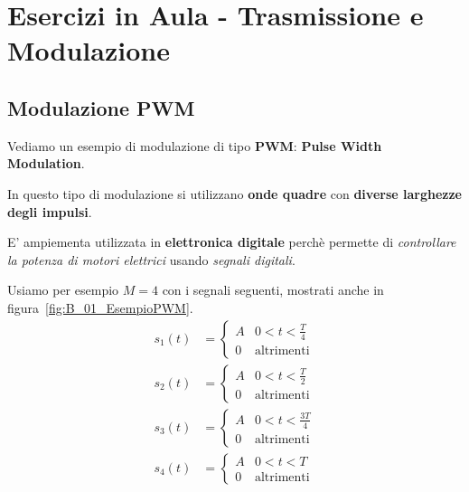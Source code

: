 
\chapter{Esercizi in Aula - Trasmissione e Modulazione}

\section{Modulazione PWM}

Vediamo un esempio di modulazione di
tipo \textbf{PWM}: \textbf{Pulse Width Modulation}.

\begin{remark}[PWM]
    In questo tipo di modulazione si utilizzano \textbf{onde quadre} con
    \textbf{diverse larghezze degli impulsi}.

    E' ampiementa utilizzata in \textbf{elettronica digitale} perchè
    permette di \textit{controllare la potenza di motori elettrici}
    usando \textit{segnali digitali}.
\end{remark}

Usiamo per esempio $M=4$ con i segnali seguenti, mostrati 
anche in figura~\ref{fig:B_01_EsempioPWM}.
\[
    \begin{aligned}
        s_{1}(t) &= \begin{cases}
            A & 0 < t <\frac{T}{4} \\ 
            0 & \text{altrimenti}
        \end{cases} \\ 
        s_{2}(t) &= \begin{cases}
            A & 0 < t <\frac{T}{2} \\ 
            0 & \text{altrimenti}
        \end{cases} \\ 
        s_{3}(t) &= \begin{cases}
            A & 0 < t <\frac{3T}{4} \\ 
            0 & \text{altrimenti}
        \end{cases} \\ 
        s_{4}(t) &= \begin{cases}
            A & 0 < t < T \\ 
            0 & \text{altrimenti}
        \end{cases} \\ 
    \end{aligned}
\]

